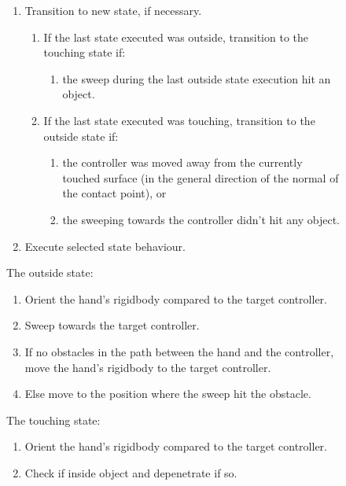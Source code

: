 \begin{figure}[H]
\small
\begin{enumerate}
\item Transition to new state, if necessary.
\begin{enumerate}[noitemsep,label=\alph*.]
\item If the last state executed was outside, transition to the touching state if:
\begin{enumerate}[noitemsep,label=\arabic*.]
\item the sweep during the last outside state execution hit an object.
\end{enumerate}
\item If the last state executed was touching, transition to the outside state if:
\begin{enumerate}[noitemsep,label=\arabic*.]
\item the controller was moved away from the currently touched surface (in the general direction of the normal of the contact point), or
\item the sweeping towards the controller didn't hit any object.
\end{enumerate}
\end{enumerate}
\item Execute selected state behaviour.
\end{enumerate}
\begin{minipage}[t]{0.49\textwidth}
\small
The outside state:
\begin{enumerate}[noitemsep]
\item Orient the hand's rigidbody compared to the target controller.
\item Sweep towards the target controller.
\item If no obstacles in the path between the hand and the controller, move the hand's rigidbody to the target controller.
\item Else move to the position where the sweep hit the obstacle.
\end{enumerate}
\end{minipage}
\hspace{2em}%
\begin{minipage}[t]{0.49\textwidth}
\small
The touching state:
\begin{enumerate}[noitemsep]
\item Orient the hand's rigidbody compared to the target controller.
\item Check if inside object and depenetrate if so.

\end{enumerate}
\end{minipage}
\end{figure}
